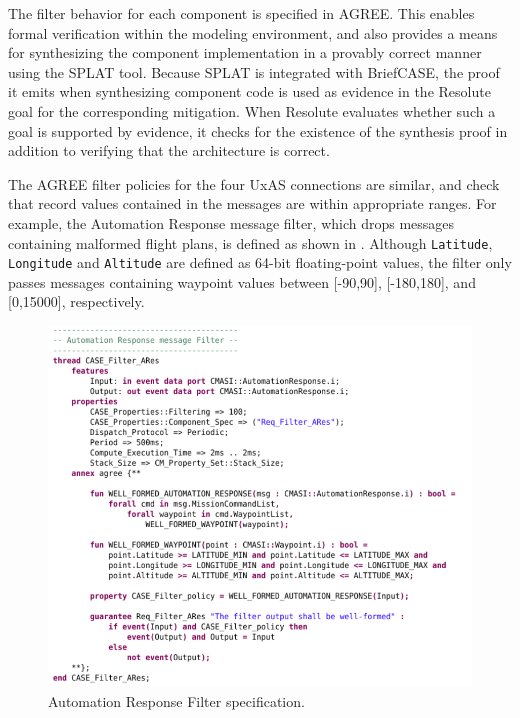 The filter behavior for each component is specified in AGREE.  This enables formal verification within the modeling environment, and also provides a means for synthesizing the component implementation in a provably correct manner using the SPLAT tool.  Because SPLAT is integrated with BriefCASE, the proof it emits when synthesizing component code is used as evidence in the Resolute goal for the corresponding mitigation.  When Resolute evaluates whether such a goal is supported by evidence, it checks for the existence of the synthesis proof in addition to verifying that the architecture is correct.

The AGREE filter policies for the four UxAS connections are similar, and check that record values contained in the messages are within appropriate ranges.  For example, the Automation Response message filter, which drops messages containing malformed flight plans, is defined as shown in .  Although \texttt{Latitude}, \texttt{Longitude} and \texttt{Altitude} are defined as 64-bit floating-point values, the filter only passes messages containing waypoint values between [-90,90], [-180,180], and [0,15000], respectively.

\begin{figure}[h]
	\centering
	\includegraphics[width=1\columnwidth]{figs/automation-response-filter.png}
	\caption{Automation Response Filter specification.}
	\label{fig:automation-response-filter}
\end{figure}

